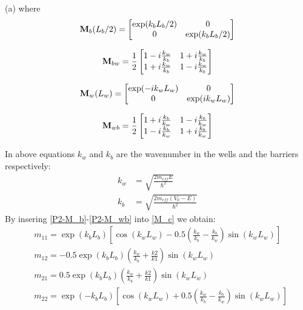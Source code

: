 \begin{homeworkProblem}
\begin{homeworkSection}{(a)}
where
\begin{equation}\label{P2-M_b}
\mathbf{M}_b(L_b/2)=
\begin{bmatrix}
\exp(k_bL_b/2) & 0\\
0 & \exp(k_bL_b/2)
\end{bmatrix}
\end{equation}

\begin{equation}
\mathbf{M}_{bw}=
\frac{1}{2}
\begin{bmatrix}
1-i\frac{k_w}{k_b}& 1+i\frac{k_w}{k_b}\\
 1+i\frac{k_w}{k_b} & 1-i\frac{k_w}{k_b}
\end{bmatrix}
\end{equation}

\begin{equation}
\mathbf{M}_w(L_w)=
\begin{bmatrix}
\exp(-ik_wL_w) & 0\\
0 & \exp(ik_wL_w)
\end{bmatrix}
\end{equation}

\begin{equation}\label{P2-M_wb}
\mathbf{M}_{wb}=
\frac{1}{2}
\begin{bmatrix}
1+i\frac{k_b}{k_w}& 1-i\frac{k_b}{k_w}\\
 1-i\frac{k_b}{k_w} & 1+i\frac{k_b}{k_w}
\end{bmatrix}
\end{equation}

In above equations $k_w$ and $k_b$ are the wavenumber in the wells and the barriers respectively:
\begin{align*}
k_w&=\sqrt{\frac{2m_{eff}E}{\hbar^2}}\\
k_b&=\sqrt{\frac{2m_{eff}(V_0-E)}{\hbar^2}}
\end{align*}
 By insering \eqref{P2-M_b}-\eqref{P2-M_wb} into \eqref{M_c} we obtain:
\begin{align}
&m_{11}=\exp(k_bL_b)\left[\cos(k_wL_w)-0.5\left(\frac{k_w}{k_b}-\frac{k_b}{k_w}\right)\sin(k_wL_w)\right]\\
&m_{12}=-0.5\exp(k_bL_b)\left(\frac{k_w}{k_b}+\frac{k2}{k1}\right)\sin(k_wL_w)\\
&m_{21}=0.5\exp(k_bL_b)\left(\frac{k_w}{k_b}+\frac{k2}{k1}\right)\sin(k_wL_w)\\
&m_{22}=\exp(-k_bL_b)\left[\cos(k_wL_w)+0.5\left(\frac{k_w}{k_b}-\frac{k_b}{k_w}\right)\sin(k_wL_w)\right]
\end{align}
 

\end{homeworkSection}
\end{homeworkProblem}
